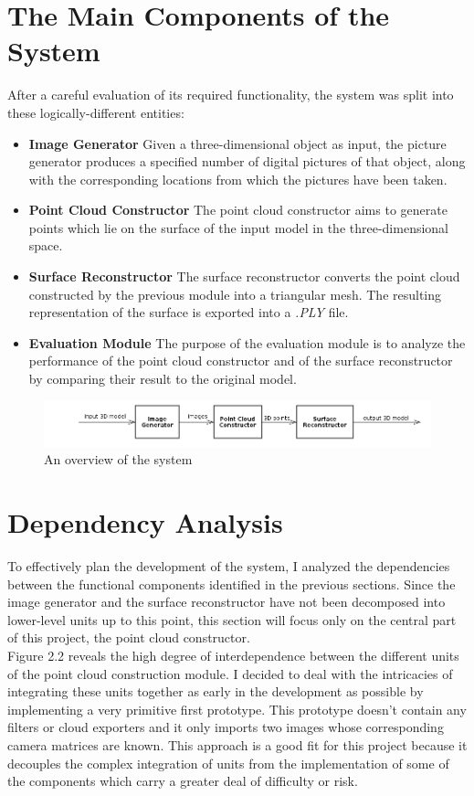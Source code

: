 \documentclass[12pt,a4paper,twoside,openright]{report}
\begin{document}
\section{The Main Components of the System}
After a careful evaluation of its required functionality, the system was split into these logically-different entities:
\begin{itemize}
\item \textbf{Image Generator}
Given a three-dimensional object as input, the picture generator produces a specified number of digital pictures of that object, along with the corresponding locations from which the pictures have been taken. 
\item \textbf{Point Cloud Constructor}
The point cloud constructor aims to generate points which lie on the surface of the input model in the three-dimensional space. 
\item \textbf{Surface Reconstructor}
The surface reconstructor converts the point cloud constructed by the previous module into a triangular mesh. The resulting representation of the surface is exported into a \textit{.PLY} file.
\item \textbf{Evaluation Module}
The purpose of the evaluation module is to analyze the performance of the point cloud constructor and of the surface reconstructor by comparing their result to the original model. \\
\end{itemize}
\begin{figure}
\centerline{\includegraphics[scale=0.7]{figs/overview.png}}
\caption{An overview of the system}
\end{figure}
 

\section{Dependency Analysis}
To effectively plan the development of the system, I analyzed the dependencies between the functional components identified in the previous sections. Since the image generator and the surface reconstructor have not been decomposed into lower-level units up to this point, this section will focus only on the central part of this project, the point cloud constructor.\\
\pagebreak
Figure 2.2 reveals the high degree of interdependence between the different units of the point cloud construction module. I decided to deal with the intricacies of integrating these units together as early in the development as possible by implementing a very primitive first prototype. This prototype doesn't contain any filters or cloud exporters and it only imports two images whose corresponding camera matrices are known. This approach is a good fit for this project because it decouples the complex integration of units from the implementation of some of the components which carry a greater deal of difficulty or risk. 
\end{document}
